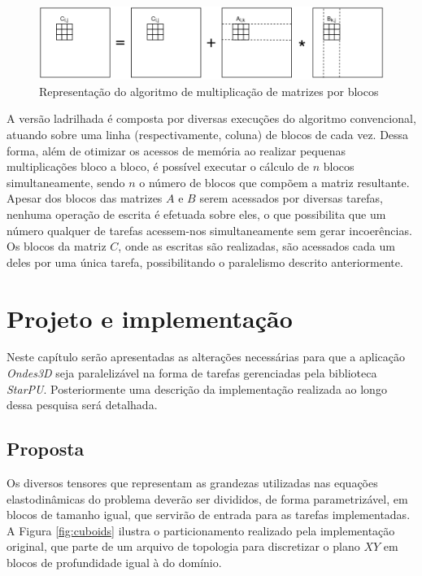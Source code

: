 \documentclass[cic,tc]{iiufrgs}
\begin{document}
\begin{figure}[!htb]
    \caption{Representação do algoritmo de multiplicação de matrizes por blocos}
    \begin{center}
      \includegraphics[width=35em]{gemm}
    \end{center}
    \label{fig:gemm}
\end{figure}

A versão ladrilhada é composta por diversas execuções do algoritmo convencional, atuando sobre uma linha (respectivamente, coluna) de blocos de cada vez. Dessa forma, além de otimizar os
acessos de memória ao realizar pequenas multiplicações bloco a bloco, é possível executar o cálculo de $n$ blocos simultaneamente, sendo $n$ o número de blocos que compõem a matriz resultante.
Apesar dos blocos das matrizes $A$ e $B$ serem acessados por diversas tarefas, nenhuma operação de escrita é efetuada sobre eles, o que possibilita que um número qualquer de tarefas acessem-nos
simultaneamente sem gerar incoerências. Os blocos da matriz $C$, onde as escritas são realizadas, são acessados cada um deles por uma única tarefa, possibilitando o paralelismo descrito anteriormente.

\chapter{Projeto e implementação}\label{sec:project}
Neste capítulo serão apresentadas as alterações necessárias para que a aplicação \textit{Ondes3D} seja paralelizável na forma de tarefas gerenciadas pela biblioteca \textit{StarPU}.
Posteriormente uma descrição da implementação realizada ao longo dessa pesquisa será detalhada.

\section{Proposta}\label{sec:proposal}

Os diversos tensores que representam as grandezas utilizadas nas equações elastodinâmicas do problema deverão ser divididos, de forma parametrizável, em blocos de tamanho igual, que servirão
de entrada para as tarefas implementadas. A Figura \ref{fig:cuboids} ilustra o particionamento realizado pela implementação original, que parte de um arquivo de topologia para discretizar o
plano $XY$ em blocos de profundidade igual à do domínio.
\end{document}
